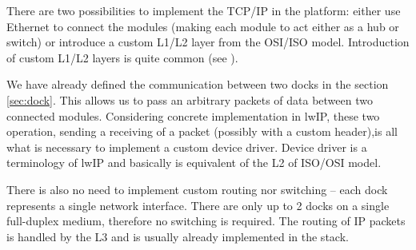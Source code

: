 There are two possibilities to implement the TCP/IP in the platform: either use
Ethernet to connect the modules (making each module to act either as a hub or
switch) or introduce a custom L1/L2 layer from the OSI/ISO
model\cite{braden_requirements_1989}. Introduction of custom L1/L2 layers is
quite common (see \cite{waitzman_ip_1999}).

We have already defined the communication between two docks in the section
\ref{sec:dock}. This allows us to pass an arbitrary packets of data between two
connected modules. Considering concrete implementation in lwIP, these two
operation, sending a receiving of a packet (possibly with a custom header),is
all what is necessary to implement a custom device driver. Device driver is a
terminology of lwIP and basically is equivalent of the L2 of ISO/OSI model.

There is also no need to implement custom routing nor switching -- each dock
represents a single network interface. There are only up to 2 docks on a single
full-duplex medium, therefore no switching is required. The routing of IP
packets is handled by the L3 and is usually already implemented in the stack.
